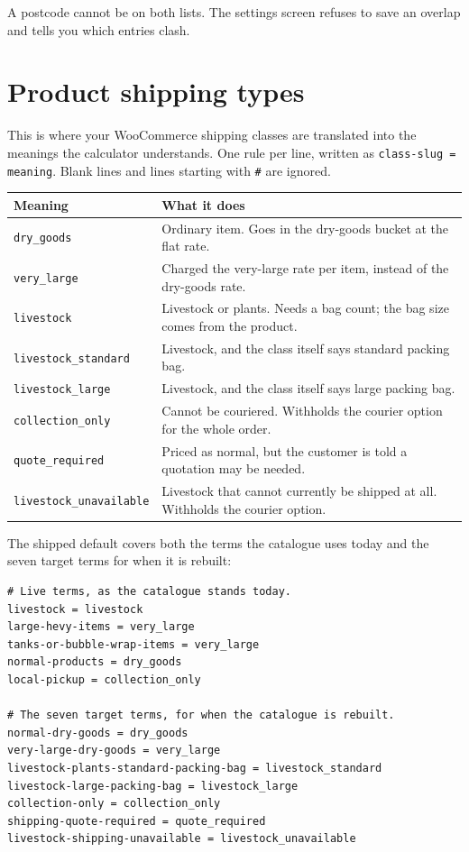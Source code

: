 \documentclass[11pt,a4paper,oneside]{report}
\newcommand{\opt}[1]{\texttt{\small #1}}
\begin{document}
A postcode cannot be on both lists. The settings screen refuses to save an overlap
and tells you which entries clash.

\section{Product shipping types}
\label{sec:classmap}

This is where your WooCommerce shipping classes are translated into the meanings the
calculator understands. One rule per line, written as \opt{class-slug = meaning}.
Blank lines and lines starting with \opt{\#} are ignored.

\begin{longtable}{@{}L{4.6cm}L{10.2cm}@{}}
\toprule
\textbf{Meaning} & \textbf{What it does}\\
\midrule
\endhead
\opt{dry\_goods} & Ordinary item. Goes in the dry-goods bucket at the flat rate.\\
\opt{very\_large} & Charged the very-large rate per item, instead of the dry-goods rate.\\
\opt{livestock} & Livestock or plants. Needs a bag count; the bag size comes from the product.\\
\opt{livestock\_standard} & Livestock, and the class itself says standard packing bag.\\
\opt{livestock\_large} & Livestock, and the class itself says large packing bag.\\
\opt{collection\_only} & Cannot be couriered. Withholds the courier option for the whole order.\\
\opt{quote\_required} & Priced as normal, but the customer is told a quotation may be needed.\\
\opt{livestock\_unavailable} & Livestock that cannot currently be shipped at all. Withholds the courier option.\\
\bottomrule
\end{longtable}

The shipped default covers both the terms the catalogue uses today and the seven
target terms for when it is rebuilt:

\begin{lstlisting}
# Live terms, as the catalogue stands today.
livestock = livestock
large-hevy-items = very_large
tanks-or-bubble-wrap-items = very_large
normal-products = dry_goods
local-pickup = collection_only

# The seven target terms, for when the catalogue is rebuilt.
normal-dry-goods = dry_goods
very-large-dry-goods = very_large
livestock-plants-standard-packing-bag = livestock_standard
livestock-large-packing-bag = livestock_large
collection-only = collection_only
shipping-quote-required = quote_required
livestock-shipping-unavailable = livestock_unavailable
\end{lstlisting}
\end{document}

